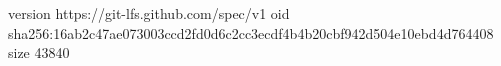 version https://git-lfs.github.com/spec/v1
oid sha256:16ab2c47ae073003ccd2fd0d6c2cc3ecdf4b4b20cbf942d504e10ebd4d764408
size 43840
